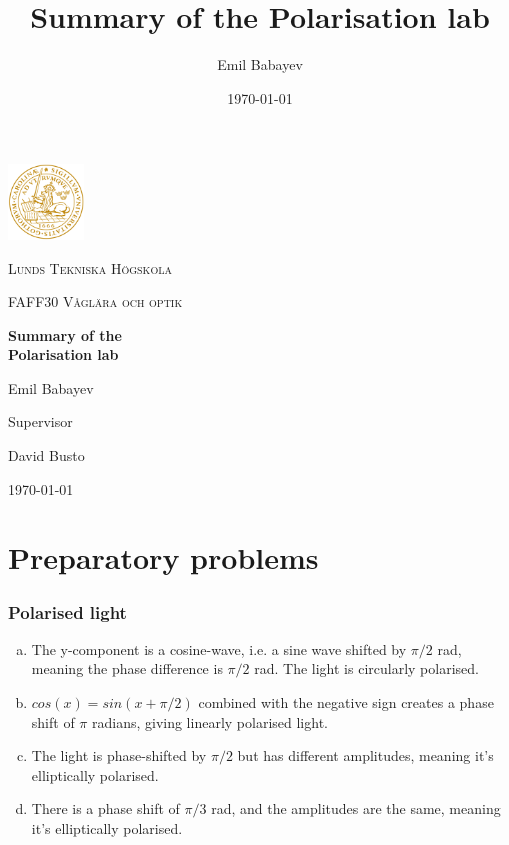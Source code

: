 \documentclass[a4paper]{article}
\title{Summary of the Polarisation lab}
\author{Emil Babayev}
\date{\today}
\begin{document}
\begin{titlepage}
	\centering
	\includegraphics[width=0.15\textwidth]{logo.png}\par\vspace{1cm}
	{\scshape\large Lunds Tekniska Högskola \par}
	\vspace{1cm}
    {\scshape\large FAFF30 Våglära och optik\par}
	\vspace{1.5cm}
	{\huge\bfseries Summary of the\\Polarisation lab\par}
	\vspace{2cm}
	{\Large Emil Babayev\par}
	\vfill
	Supervisor\par
    David Busto

    \vfill
    
	{\large \today \par}
\end{titlepage}
\section{Preparatory problems}
\subsubsection{Polarised light}
\begin{enumerate}[a)]
    \item The y-component is a cosine-wave, i.e. a sine wave shifted by $\pi/2$ rad, meaning the phase difference is $\pi/2$ rad. The light is circularly polarised.
    \item $cos(x) = sin(x + \pi/2)$ combined with the negative sign creates a phase shift of $\pi$ radians, giving linearly polarised light.
    \item The light is phase-shifted by $\pi/2$ but has different amplitudes, meaning it's elliptically polarised.
    \item There is a phase shift of $\pi/3$ rad, and the amplitudes are the same, meaning it's elliptically polarised.
\end{enumerate}
\end{document}
